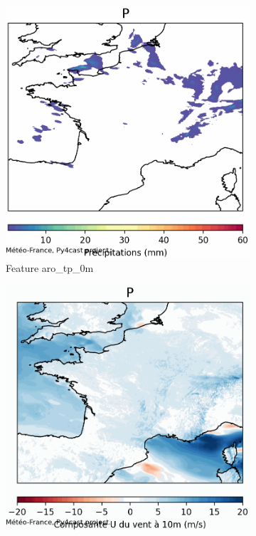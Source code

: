 \begin{figure}[h]
    \centering
    \begin{subfigure}[b]{0.3\textwidth}
        \includegraphics[width=\textwidth]{Images/titan_data_examples/2023111700_feature_aro_tp_0m.png}
        \caption{Feature aro\_tp\_0m}
        \label{fig:titan_aro_tp}
    \end{subfigure}
    \hfill
    \begin{subfigure}[b]{0.3\textwidth}
        \includegraphics[width=\textwidth]{Images/titan_data_examples/2023111700_feature_aro_u10_10m.png}

\end{subfigure}
\end{figure}
